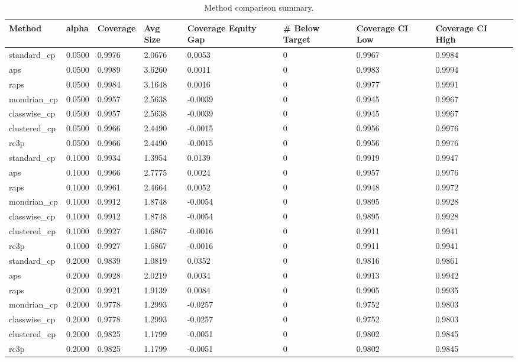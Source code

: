 \begin{table}[htbp]
\centering
\caption{Method comparison summary.}
\label{tab:method\_comparison}
\begin{tabular}{llllllll}
\hline
Method & alpha & Coverage & Avg Size & Coverage Equity Gap & \# Below Target & Coverage CI Low & Coverage CI High \\
\hline
standard\_cp & 0.0500 & 0.9976 & 2.0676 & 0.0053 & 0 & 0.9967 & 0.9984 \\
aps & 0.0500 & 0.9989 & 3.6260 & 0.0011 & 0 & 0.9983 & 0.9994 \\
raps & 0.0500 & 0.9984 & 3.1648 & 0.0016 & 0 & 0.9977 & 0.9991 \\
mondrian\_cp & 0.0500 & 0.9957 & 2.5638 & -0.0039 & 0 & 0.9945 & 0.9967 \\
classwise\_cp & 0.0500 & 0.9957 & 2.5638 & -0.0039 & 0 & 0.9945 & 0.9967 \\
clustered\_cp & 0.0500 & 0.9966 & 2.4490 & -0.0015 & 0 & 0.9956 & 0.9976 \\
rc3p & 0.0500 & 0.9966 & 2.4490 & -0.0015 & 0 & 0.9956 & 0.9976 \\
standard\_cp & 0.1000 & 0.9934 & 1.3954 & 0.0139 & 0 & 0.9919 & 0.9947 \\
aps & 0.1000 & 0.9966 & 2.7775 & 0.0024 & 0 & 0.9957 & 0.9976 \\
raps & 0.1000 & 0.9961 & 2.4664 & 0.0052 & 0 & 0.9948 & 0.9972 \\
mondrian\_cp & 0.1000 & 0.9912 & 1.8748 & -0.0054 & 0 & 0.9895 & 0.9928 \\
classwise\_cp & 0.1000 & 0.9912 & 1.8748 & -0.0054 & 0 & 0.9895 & 0.9928 \\
clustered\_cp & 0.1000 & 0.9927 & 1.6867 & -0.0016 & 0 & 0.9911 & 0.9941 \\
rc3p & 0.1000 & 0.9927 & 1.6867 & -0.0016 & 0 & 0.9911 & 0.9941 \\
standard\_cp & 0.2000 & 0.9839 & 1.0819 & 0.0352 & 0 & 0.9816 & 0.9861 \\
aps & 0.2000 & 0.9928 & 2.0219 & 0.0034 & 0 & 0.9913 & 0.9942 \\
raps & 0.2000 & 0.9921 & 1.9139 & 0.0084 & 0 & 0.9905 & 0.9935 \\
mondrian\_cp & 0.2000 & 0.9778 & 1.2993 & -0.0257 & 0 & 0.9752 & 0.9803 \\
classwise\_cp & 0.2000 & 0.9778 & 1.2993 & -0.0257 & 0 & 0.9752 & 0.9803 \\
clustered\_cp & 0.2000 & 0.9825 & 1.1799 & -0.0051 & 0 & 0.9802 & 0.9845 \\
rc3p & 0.2000 & 0.9825 & 1.1799 & -0.0051 & 0 & 0.9802 & 0.9845 \\
\hline
\end{tabular}
\end{table}
